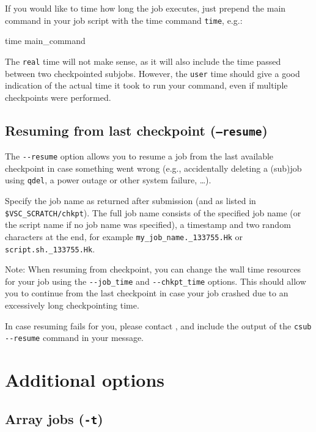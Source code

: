 If you would like to time how long the job executes, just prepend the main command in your job script with
the time command \lstinline|time|, e.g.:

\begin{prompt}
time main_command
\end{prompt}

The \lstinline|real| time will not make sense, as it will also include the time
passed between two checkpointed subjobs. However, the \lstinline|user| time should give a good
indication of the actual time it took to run your command, even if multiple checkpoints were performed.

\subsection{Resuming from last checkpoint (\texttt{--resume})}

The \lstinline|--resume| option allows you to resume a job from the
last available checkpoint in case something went wrong
(e.g., accidentally deleting a (sub)job using \lstinline|qdel|, a power outage or other system failure, \ldots).

Specify the job name as returned after submission (and as listed in \texttt{\$VSC\_SCRATCH/chkpt}).
The full job name consists of the specified job name (or the script name if no job name was specified),
a timestamp and two random characters at the end, for example \texttt{my\_job\_name.\the{}\_133755.Hk}
or \texttt{script.sh.\the{}\_133755.Hk}.

Note: When resuming from checkpoint, you can change the wall time resources for your job using the \lstinline|--job_time| and
\lstinline|--chkpt_time| options. This should allow you to continue from the last checkpoint
in case your job crashed due to an excessively long checkpointing time.

In case resuming fails for you, please contact \hpcinfo, and include the output
of the \lstinline|csub --resume| command in your message.

\section{Additional options}

\subsection{Array jobs (\texttt{-t})}

